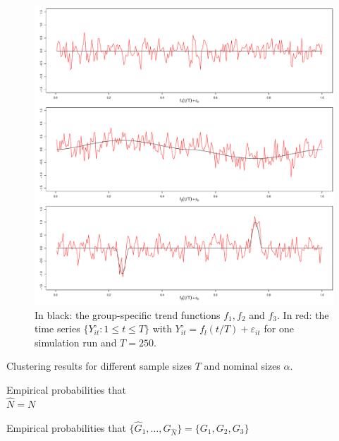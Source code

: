 \documentclass[12pt]{article}
\begin{document}
\begin{figure}[t!]
\includegraphics[width=\textwidth]{../output/clustering_functions.pdf}
\caption{In black: the group-specific trend functions $f_1, f_2$ and $f_3$. In red: the time series $\{Y_{it}^\circ : 1 \le t \le T \}$ with $Y_{it}^\circ = f_l(t/T) + \varepsilon_{it}$ for one simulation run and $T=250$.}\label{fig:clustering_fcts}
\end{figure}


\begin{table}[t]
\footnotesize{
\begin{center}
\caption{Clustering results for different sample sizes $T$ and nominal sizes $\alpha$.}\label{tab:clustering}
\begin{subtable}[b]{0.48\textwidth}
\centering
\caption{Empirical probabilities that \\ $\widehat{N} = N$}\label{tab:clustering:1}
\renewcommand{\arraystretch}{1.2}
{\color{red}}
\end{subtable}
\begin{subtable}[b]{0.48\textwidth}
\centering
\caption{\centering Empirical probabilities that $\{ \widehat{G}_1,\ldots,\widehat{G}_{\widehat{N}}\} = \{ G_1,G_2,G_3\}$}\label{tab:clustering:2}
\renewcommand{\arraystretch}{1.2}
{\color{red}}
\end{subtable}
\end{center}}
\vspace{-0.5cm}
\end{table}
\end{document}
